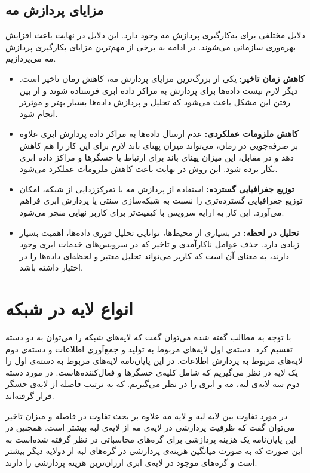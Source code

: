   \subsection{مزایای پردازش مه}
  دلایل مختلفی برای به‌کارگیری پردازش مه وجود دارد. این دلایل در نهایت باعث افزایش بهره‌وری سازمانی می‌شوند. در ادامه به برخی از مهم‌ترین مزایای بکارگیری پردازش مه می‌پردازیم.
  \begin{itemize}
  \item \textbf{کاهش زمان تاخیر:}
  یکی از بزرگ‌ترین مزایای پردازش مه، کاهش زمان تاخیر است. دیگر لازم نیست داده‌ها برای پردازش به مراکز داده ابری فرستاده شوند و از بین رفتن این مشکل باعث می‌شود که تحلیل و پردازش داده‌ها بسیار بهتر و موثرتر انجام شود.
  
  \item \textbf{کاهش ملزومات عملکردی:}
  عدم ارسال داده‌ها به مراکز داده پردازش ابری علاوه بر صرفه‌جویی در زمان، می‌تواند میزان پهنای باند لازم برای این کار را هم کاهش دهد و در مقابل، این میزان پهنای باند برای ارتباط با حسگرها و مراکز داده ابری بکار برده شود. این روش در نهایت باعث کاهش ملزومات عملکرد می‌شود.
  
  \item \textbf{توزیع جغرافیایی گسترده:}
  استفاده از پردازش مه با تمرکززدایی از شبکه، امکان توزیع جغرافیایی گسترده‌تری را نسبت به شبکه‌سازی سنتی یا پردازش ابری فراهم می‌آورد. این کار به ارایه سرویس با کیفیت‌تر برای کاربر نهایی منجر می‌شود.
  
  \item \textbf{تحلیل در لحظه:}
  در بسیاری از محیط‌ها، توانایی تحلیل فوری داده‌ها، اهمیت بسیار زیادی دارد. حذف عوامل ناکارآمدی و تاخیر که در سرویس‌های خدمات ابری وجود دارند، به معنای آن است که کاربر می‌تواند تحلیل معتبر و لحظه‌ای داده‌ها را در اختیار داشته باشد.
    \end{itemize}
  
  \section{انواع لایه در شبکه}
  با توجه به مطالب گفته شده می‌توان گفت که لایه‌های شبکه را می‌توان به دو دسته تقسیم کرد. دسته‌ی اول لایه‌های مربوط به تولید و جمع‌آوری اطلاعات و دسته‌ی دوم لایه‌های مربوط به پردازش اطلاعات.
  در این پایان‌نامه لایه‌های مربوط به دسته‌ی اول را یک لایه در نظر می‌گیریم که شامل کلیه‌ی حسگرها و فعال‌کننده‌هاست. در مورد دسته دوم سه لایه‌ی لبه، مه و ابری را در نظر می‌گیریم. که به ترتیب فاصله از لایه‌ی حسگر قرار گرفته‌اند.   
 
  در مورد تفاوت بین لایه‌ لبه و لایه مه علاوه بر بحث تفاوت در فاصله و میزان تاخیر می‌توان گفت که ظرفیت پردازشی در لایه‌ی مه از لایه‌ی لبه بیشتر است. همچنین در این پایان‌نامه یک هزینه پردازشی برای گره‌های محاسباتی در نظر گرفته شده‌است به این صورت که به صورت میانگین هزینه‌ی پردازشی در گره‌های لبه از دولایه دیگر بیشتر است و گره‌های موجود در لایه‌ی ابری ارزان‌ترین هزینه پردازشی را دارند. 
  
